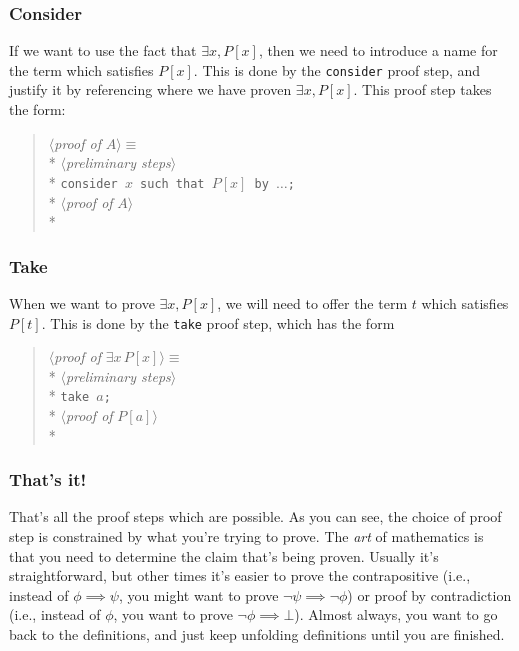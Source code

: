 \subsubsection{Consider}
If we want to use the fact that $\exists x,P[x]$, then we need to
introduce a name for the term which satisfies $P[x]$. This is done by
the \verb|consider| proof step, and justify it by referencing where we
have proven $\exists x,P[x]$. This proof step takes the form:
\begin{verse}
$\langle${\em proof of \/}$A\rangle \equiv$\\*
\qquad $\langle${\em preliminary steps\/}$\rangle$\\*
\qquad \verb|consider |$x$\verb| such that |$P[x]$\verb| by |$\ldots$\verb|;|\\*
\qquad $\langle${\em proof of \/}$A\rangle$\\*
\end{verse}

\subsubsection{Take}
When we want to prove $\exists x,P[x]$, we will need to offer the term
$t$ which satisfies $P[t]$. This is done by the \verb|take| proof step,
which has the form
\begin{verse}
$\langle${\em proof of \/}$\exists x\,P[x]\rangle \equiv$\\*
\qquad $\langle${\em preliminary steps\/}$\rangle$\\*
\qquad \verb|take |$a$\verb|;|\\*
\qquad $\langle${\em proof of \/}$P[a]\rangle$\\*
\end{verse}

\subsubsection{That's it!}
That's all the proof steps which are possible. As you can see, the
choice of proof step is constrained by what you're trying to prove. The
\emph{art} of mathematics is that you need to determine the claim that's
being proven. Usually it's straightforward, but other times it's easier
to prove the contrapositive (i.e., instead of $\phi\implies\psi$, you
might want to prove $\neg\psi\implies\neg\phi$) or proof by
contradiction (i.e., instead of $\phi$, you want to prove
$\neg\phi\implies\bot$). Almost always, you want to go back to the
definitions, and just keep unfolding definitions until you are finished.

